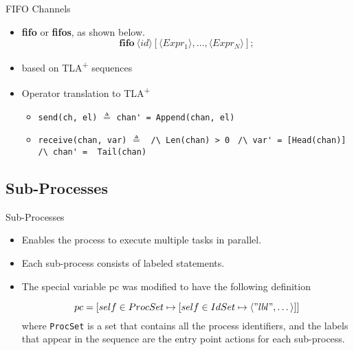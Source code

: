 \documentclass{beamer}
\newcommand\tab[1][1cm]{\hspace*{#1}}
\newcommand{\tlaplus}{TLA\textsuperscript{+}\xspace}
\newcommand{\seq}[1]{\langle #1 \rangle}
\newcommand{\keyword}[1]{\textbf{#1}}
\newcommand{\entity}[1]{\ensuremath{\langle}#1\ensuremath{\rangle}}
\begin{document}
\begin{frame}[fragile]{FIFO Channels}
    \begin{itemize}
        \item \keyword{fifo} or \keyword{fifos}, as shown below.
        \[
            \keyword{fifo}\ \entity{id}[\entity{Expr_1},\dots,\entity{Expr_N}];
        \]
         \item based on \tlaplus sequences
     \item Operator translation to \tlaplus

            \begin{itemize}
                \item \verb|send(ch, el)| $\triangleq$
                \verb|chan' = Append(chan, el)| 
                \newline
                \item \verb|receive(chan, var)| $\triangleq$
                      \verb| /\ Len(chan) > 0 | \newline \tab\tab\tab\tab
                         \verb|/\ var' = [Head(chan)]|\newline \tab\tab\tab\tab
                         \verb|/\ chan' =  Tail(chan)|
            \end{itemize}
    \end{itemize}
\end{frame}

\subsection{Sub-Processes}

\begin{frame}[fragile]{Sub-Processes}
    \begin{itemize}
     \item Enables the process to execute multiple tasks in parallel.
     \item Each sub-process consists of labeled statements.
     \item The special variable pc was modified to have the following definition

\[
pc = [self \in ProcSet \mapsto [self \in IdSet \mapsto \seq{"lbl",\dots}]]
\]	
    where \verb|ProcSet| is a set that contains all the process identifiers, and the labels that appear in the sequence are the entry point actions for each sub-process.

    \end{itemize}
\end{frame}
\end{document}
